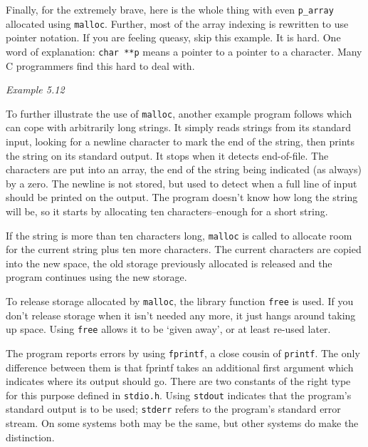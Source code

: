   Finally, for the extremely brave, here is the whole thing with even
   \texttt{p\_array} allocated using \texttt{malloc}. Further, most
   of the array indexing is rewritten to use pointer notation. If you are
   feeling queasy, skip this example. It is hard. One word of explanation:
   \texttt{char **p} means a pointer to a pointer to a character. Many
   C programmers find this hard to deal with.


  \begin{center}\textit{Example 5.12}\end{center}


  To further illustrate the use of \texttt{malloc}, another example
   program follows which can cope with arbitrarily long strings. It simply
   reads strings from its standard input, looking for a newline character to
   mark the end of the string, then prints the string on its standard
   output.  It stops when it detects end-of-file. The characters are put
   into an array, the end of the string being indicated (as always) by
   a zero. The newline is not stored, but used to detect when a full line of
   input should be printed on the output. The program doesn't know how long
   the string will be, so it starts by allocating ten characters--enough
   for a short string.


  If the string is more than ten characters long, \texttt{malloc} is
   called to allocate room for the current string plus ten more characters.
   The current characters are copied into the new space, the old storage
   previously allocated is released and the program continues using the new
   storage.


  To release storage allocated by \texttt{malloc}, the library
   function \texttt{free} is used. If you don't release storage when it
   isn't needed any more, it just hangs around taking up space. Using
   \texttt{free} allows it to be `given away', or at least re-used
   later.


  The program reports errors by using \texttt{fprintf}, a close
   cousin of \texttt{printf}. The only difference between them is that
   fprintf takes an additional first argument which indicates where its
   output should go. There are two constants of the right type for this
   purpose defined in \texttt{stdio.h}. Using \texttt{stdout}
   indicates that the program's standard output is to be used;
   \texttt{stderr} refers to the program's standard error stream. On
   some systems both may be the same, but other systems do make the
   distinction.


